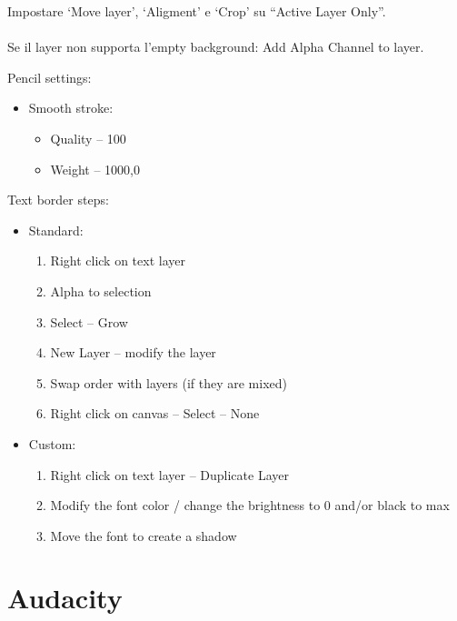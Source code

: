 \documentclass[12pt]{article}
\begin{document}
Impostare `Move layer', `Aligment' e `Crop' su ``Active Layer Only''.\\
\\Se il layer non supporta l'empty background: Add Alpha Channel to layer.

\vspace{20px}

Pencil settings:
\begin{itemize}
    \item Smooth stroke:
    \begin{itemize}
        \item Quality -- 100
        \item Weight -- 1000,0
    \end{itemize}
\end{itemize}



\vspace{20px}

Text border steps:
\begin{itemize}
    \item Standard:
\begin{enumerate}
    \item Right click on text layer
    \item Alpha to selection
    \item Select -- Grow
    \item New Layer -- modify the layer
    \item Swap order with layers (if they are mixed)
    \item Right click on canvas -- Select -- None
\end{enumerate}

    \item Custom:
    \begin{enumerate}
        \item Right click on text layer -- Duplicate Layer
        \item Modify the font color / change the brightness to 0 and/or black to max
        \item Move the font to create a shadow
    \end{enumerate}

\end{itemize}






\clearpage{}
\section{Audacity}
\end{document}
